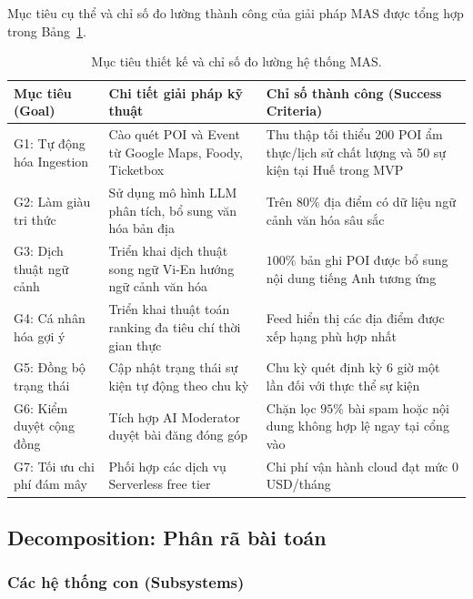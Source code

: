Mục tiêu cụ thể và chỉ số đo lường thành công của giải pháp MAS được tổng hợp trong Bảng~\ref{tab:goals_success_criteria}.

\begin{table}[H]
\centering
\begin{tabularx}{\textwidth}{l X X}
\toprule
\textbf{Mục tiêu (Goal)} & \textbf{Chi tiết giải pháp kỹ thuật} & \textbf{Chỉ số thành công (Success Criteria)} \\
\midrule
G1: Tự động hóa Ingestion & Cào quét POI và Event từ Google Maps, Foody, Ticketbox & Thu thập tối thiểu 200 POI ẩm thực/lịch sử chất lượng và 50 sự kiện tại Huế trong MVP \\
G2: Làm giàu tri thức & Sử dụng mô hình LLM phân tích, bổ sung văn hóa bản địa & Trên $80\%$ địa điểm có dữ liệu ngữ cảnh văn hóa sâu sắc \\
G3: Dịch thuật ngữ cảnh & Triển khai dịch thuật song ngữ Vi-En hướng ngữ cảnh văn hóa & $100\%$ bản ghi POI được bổ sung nội dung tiếng Anh tương ứng \\
G4: Cá nhân hóa gợi ý & Triển khai thuật toán ranking đa tiêu chí thời gian thực & Feed hiển thị các địa điểm được xếp hạng phù hợp nhất \\
G5: Đồng bộ trạng thái & Cập nhật trạng thái sự kiện tự động theo chu kỳ & Chu kỳ quét định kỳ 6 giờ một lần đối với thực thể sự kiện \\
G6: Kiểm duyệt cộng đồng & Tích hợp AI Moderator duyệt bài đăng đóng góp & Chặn lọc $95\%$ bài spam hoặc nội dung không hợp lệ ngay tại cổng vào \\
G7: Tối ưu chi phí đám mây & Phối hợp các dịch vụ Serverless free tier & Chi phí vận hành cloud đạt mức $0$ USD/tháng \\
\bottomrule
\end{tabularx}
\caption{Mục tiêu thiết kế và chỉ số đo lường hệ thống MAS.}
\label{tab:goals_success_criteria}
\end{table}

\subsection{Decomposition: Phân rã bài toán}

\subsubsection{Các hệ thống con (Subsystems)}

